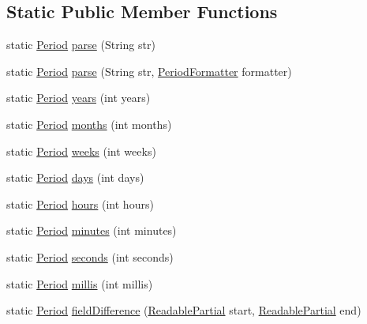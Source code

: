 \subsection*{Static Public Member Functions}
\begin{DoxyCompactItemize}
\item 
static \hyperlink{classorg_1_1joda_1_1time_1_1_period}{Period} \hyperlink{classorg_1_1joda_1_1time_1_1_period_a3f1899a046441dd46d62af2b8152a063}{parse} (String str)
\item 
static \hyperlink{classorg_1_1joda_1_1time_1_1_period}{Period} \hyperlink{classorg_1_1joda_1_1time_1_1_period_a0c029d5f6bf46fb1df6d90437ec359a2}{parse} (String str, \hyperlink{classorg_1_1joda_1_1time_1_1format_1_1_period_formatter}{Period\-Formatter} formatter)
\item 
static \hyperlink{classorg_1_1joda_1_1time_1_1_period}{Period} \hyperlink{classorg_1_1joda_1_1time_1_1_period_a66e80f9c84c85c2c4771d2707019f3be}{years} (int years)
\item 
static \hyperlink{classorg_1_1joda_1_1time_1_1_period}{Period} \hyperlink{classorg_1_1joda_1_1time_1_1_period_a6c2ea42e8126f8efbcef7dafb3f5523f}{months} (int months)
\item 
static \hyperlink{classorg_1_1joda_1_1time_1_1_period}{Period} \hyperlink{classorg_1_1joda_1_1time_1_1_period_aa9f8fe59287d8345b10952d40f3fd1a7}{weeks} (int weeks)
\item 
static \hyperlink{classorg_1_1joda_1_1time_1_1_period}{Period} \hyperlink{classorg_1_1joda_1_1time_1_1_period_a1aeabdf0084c31e9445f9ba433664d0f}{days} (int days)
\item 
static \hyperlink{classorg_1_1joda_1_1time_1_1_period}{Period} \hyperlink{classorg_1_1joda_1_1time_1_1_period_abc5a174f4e19e438ff8cade9302c1b55}{hours} (int hours)
\item 
static \hyperlink{classorg_1_1joda_1_1time_1_1_period}{Period} \hyperlink{classorg_1_1joda_1_1time_1_1_period_a9fc2841495222e8cb471c63e50f05d23}{minutes} (int minutes)
\item 
static \hyperlink{classorg_1_1joda_1_1time_1_1_period}{Period} \hyperlink{classorg_1_1joda_1_1time_1_1_period_a49e8e4b7afb6b4146e1c560ee70329ec}{seconds} (int seconds)
\item 
static \hyperlink{classorg_1_1joda_1_1time_1_1_period}{Period} \hyperlink{classorg_1_1joda_1_1time_1_1_period_a73e25c903c383c44a94bafb1988802a1}{millis} (int millis)
\item 
static \hyperlink{classorg_1_1joda_1_1time_1_1_period}{Period} \hyperlink{classorg_1_1joda_1_1time_1_1_period_a898494ac6da23e00c1b071c63d42b118}{field\-Difference} (\hyperlink{interfaceorg_1_1joda_1_1time_1_1_readable_partial}{Readable\-Partial} start, \hyperlink{interfaceorg_1_1joda_1_1time_1_1_readable_partial}{Readable\-Partial} end)
\end{DoxyCompactItemize}
